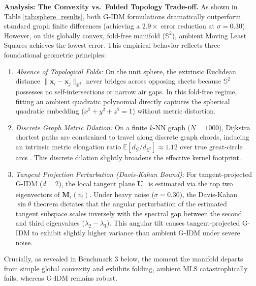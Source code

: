 \documentclass[11pt,a4paper]{article}
\theoremstyle{definition}
\begin{document}
\noindent\textbf{Analysis: The Convexity vs.\ Folded Topology Trade-off.} As shown in Table \ref{tab:sphere_results}, both G-IDM formulations dramatically outperform standard graph finite differences (achieving a $2.9\times$ error reduction at $\sigma = 0.30$). However, on this globally convex, fold-free manifold ($\mathbb{S}^2$), ambient Moving Least Squares achieves the lowest error. This empirical behavior reflects three foundational geometric principles:
\begin{enumerate}
    \item \emph{Absence of Topological Folds:} On the unit sphere, the extrinsic Euclidean distance $\|\mathbf{x}_i - \mathbf{x}_j\|_{\mathbb{R}^3}$ never bridges across opposing sheets because $\mathbb{S}^2$ possesses no self-intersections or narrow air gaps. In this fold-free regime, fitting an ambient quadratic polynomial directly captures the spherical quadratic embedding ($x^2 + y^2 + z^2 = 1$) without metric distortion.
    \item \emph{Discrete Graph Metric Dilation:} On a finite $k$-NN graph ($N = 1000$), Dijkstra shortest paths are constrained to travel along discrete graph chords, inducing an intrinsic metric elongation ratio $\mathbb{E}[d_{\mathcal{G}} / d_{\mathbb{S}^2}] \approx 1.12$ over true great-circle arcs \cite{alamgir2012}. This discrete dilation slightly broadens the effective kernel footprint.
    \item \emph{Tangent Projection Perturbation (Davis-Kahan Bound):} For tangent-projected G-IDM ($d = 2$), the local tangent plane $\mathbf{U}_\parallel$ is estimated via the top two eigenvectors of $\mathbf{M}_\epsilon(v_i)$. Under heavy noise ($\sigma = 0.30$), the Davis-Kahan $\sin\theta$ theorem dictates that the angular perturbation of the estimated tangent subspace scales inversely with the spectral gap between the second and third eigenvalues ($\lambda_2 - \lambda_3$). This angular tilt causes tangent-projected G-IDM to exhibit slightly higher variance than ambient G-IDM under severe noise.
\end{enumerate}
Crucially, as revealed in Benchmark 3 below, the moment the manifold departs from simple global convexity and exhibits folding, ambient MLS catastrophically fails, whereas G-IDM remains robust.
\end{document}
